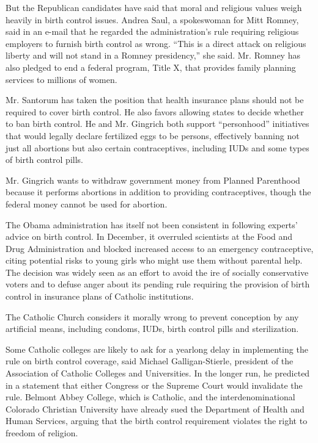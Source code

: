 But the Republican candidates have said that moral and religious values
weigh heavily in birth control issues. Andrea Saul, a spokeswoman for
Mitt Romney, said in an e-mail that he regarded the administration's
rule requiring religious employers to furnish birth control as wrong.
``This is a direct attack on religious liberty and will not stand in a
Romney presidency,'' she said. Mr. Romney has also pledged to end a
federal program, Title X, that provides family planning services to
millions of women.

Mr. Santorum has taken the position that health insurance plans should
not be required to cover birth control. He also favors allowing states
to decide whether to ban birth control. He and Mr. Gingrich both support
``personhood'' initiatives that would legally declare fertilized eggs to
be persons, effectively banning not just all abortions but also certain
contraceptives, including IUDs and some types of birth control pills.

Mr. Gingrich wants to withdraw government money from Planned Parenthood
because it performs abortions in addition to providing contraceptives,
though the federal money cannot be used for abortion.

The Obama administration has itself not been consistent in following
experts' advice on birth control. In December, it overruled scientists
at the Food and Drug Administration and blocked increased access to an
emergency contraceptive, citing potential risks to young girls who might
use them without parental help. The decision was widely seen as an
effort to avoid the ire of socially conservative voters and to defuse
anger about its pending rule requiring the provision of birth control in
insurance plans of Catholic institutions.

The Catholic Church considers it morally wrong to prevent conception by
any artificial means, including condoms, IUDs, birth control pills and
sterilization.

Some Catholic colleges are likely to ask for a yearlong delay in
implementing the rule on birth control coverage, said Michael
Galligan-Stierle, president of the Association of Catholic Colleges and
Universities. In the longer run, he predicted in a statement that either
Congress or the Supreme Court would invalidate the rule. Belmont Abbey
College, which is Catholic, and the interdenominational Colorado
Christian University have already sued the Department of Health and
Human Services, arguing that the birth control requirement violates the
right to freedom of religion.

